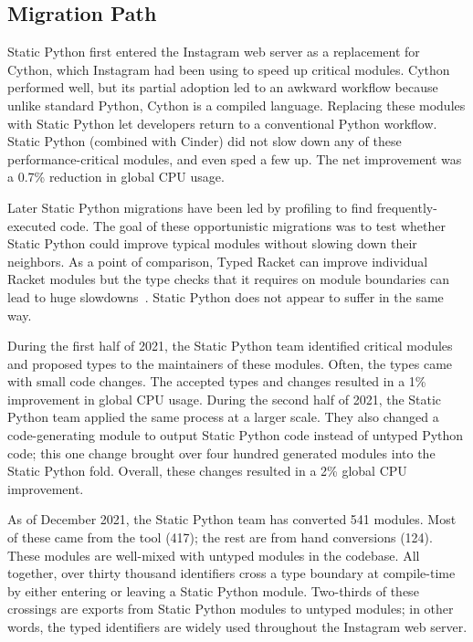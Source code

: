 \documentclass[english,cleveref,submission]{programming}
\newcommand{\SP}{Static Python}
\begin{document}
\subsection{Migration Path}

\SP{} first entered the Instagram web server as a replacement for Cython,
which Instagram had been using to speed up critical modules.
Cython performed well, but its partial adoption led to an awkward workflow
because unlike standard Python, Cython is a compiled language.
Replacing these modules with \SP{} let developers return to a conventional
Python workflow.
\SP{} (combined with Cinder) did not slow down any of these
performance-critical modules, and even sped a few up.
The net improvement was a 0.7\% reduction in global CPU usage.

Later \SP{} migrations have been led by profiling to find frequently-executed code.
The goal of these opportunistic migrations was to test whether \SP{} could
improve typical modules without slowing down their neighbors.
As a point of comparison, Typed Racket can improve individual Racket
modules but the type checks that it requires on module boundaries
can lead to huge slowdowns~\cite{tfgnvf-popl-2016,gtnffvf-jfp-2019}.
\SP{} does not appear to suffer in the same way.

During the first half of 2021, the \SP{} team identified critical
modules and proposed types to the maintainers of these modules.
Often, the types came with small code changes.
The accepted types and changes resulted in a 1\% improvement
in global CPU usage.
During the second half of 2021, the \SP{} team applied the same
process at a larger scale.
They also changed a code-generating module to output \SP{} code instead
of untyped Python code;
this one change brought over four hundred generated modules into the \SP{} fold.
Overall, these changes resulted in a 2\% global CPU improvement.

As of December 2021, the \SP{} team has converted 541 modules.
Most of these came from the tool (417); the rest
are from hand conversions (124).
These modules are well-mixed with untyped modules in the codebase.
All together, over thirty thousand identifiers cross a type boundary
at compile-time by either entering or leaving a \SP{} module.
Two-thirds of these crossings are exports from \SP{} modules
to untyped modules;
in other words, the typed identifiers are widely used throughout the Instagram web server.
\end{document}
